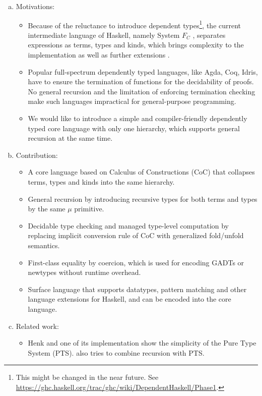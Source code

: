 \documentclass[preprint]{sigplanconf}
\begin{document}
\begin{enumerate}[a)]
\item Motivations:

\begin{itemize}
\item Because of the reluctance to introduce dependent types\footnote{This might be changed in the near future. See \url{https://ghc.haskell.org/trac/ghc/wiki/DependentHaskell/Phase1}.}, the current intermediate language of Haskell, namely System $F_C$ \cite{fc}, separates expressions as terms, types and kinds, which brings complexity to the implementation as well as further extensions \cite{fc:pro,fc:kind}.

\item Popular full-spectrum dependently typed languages, like Agda, Coq, Idris, have to ensure the termination of functions for the decidability of proofs. No general recursion and the limitation of enforcing termination checking make such languages impractical for general-purpose programming.

\item We would like to introduce a simple and compiler-friendly dependently typed core language with only one hierarchy, which supports general recursion at the same time.
\end{itemize}

\item Contribution:
\begin{itemize}
\item A core language based on Calculus of Constructions (CoC) that collapses terms, types and kinds into the same hierarchy.
\item General recursion by introducing recursive types for both terms and types by the same $\mu$ primitive.
\item Decidable type checking and managed type-level computation by replacing implicit conversion rule of CoC with generalized \textsf{fold}/\textsf{unfold} semantics.
\item First-class equality by coercion, which is used for encoding GADTs or newtypes without runtime overhead.
\item Surface language that supports datatypes, pattern matching and other language extensions for Haskell, and can be encoded into the core language.
\end{itemize}

\item Related work:

\begin{itemize}
\item Henk \cite{pts:henk} and one of its implementation \cite{pts:fp} show the simplicity of the Pure Type System (PTS). \cite{pts:rec} also tries to combine recursion with PTS.


\end{itemize}
\end{enumerate}
\end{document}
